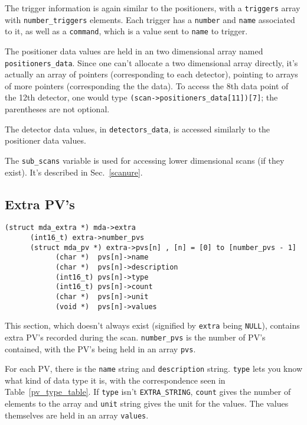 \documentclass[10pt,letterpaper]{article}
\begin{document}
The trigger information is again similar to the positioners, with a
\verb+triggers+ array with \verb+number_triggers+ elements.  Each
trigger has a \verb+number+ and \verb+name+ associated to it, as well
as a \verb+command+, which is a value sent to \verb+name+ to trigger.

The positioner data values are held in an two dimensional array named
\verb+positioners_data+.  Since one can't allocate a two dimensional
array directly, it's actually an array of pointers (corresponding to
each detector), pointing to arrays of more pointers (corresponding the
the data).  To access the 8th data point of the 12th detector, one
would type \verb+(scan->positioners_data[11])[7]+; the parentheses are
not optional.

The detector data values, in \verb+detectors_data+, is accessed
similarly to the positioner data values.

The \verb+sub_scans+ variable is used for accessing lower dimensional
scans (if they exist).  It's described in Sec.~\ref{scanure}.


\subsection{Extra PV's}

\begin{verbatim}
(struct mda_extra *) mda->extra
      (int16_t) extra->number_pvs
      (struct mda_pv *) extra->pvs[n] , [n] = [0] to [number_pvs - 1]
            (char *)  pvs[n]->name
            (char *)  pvs[n]->description
            (int16_t) pvs[n]->type    
            (int16_t) pvs[n]->count
            (char *)  pvs[n]->unit
            (void *)  pvs[n]->values
\end{verbatim}

This section, which doesn't always exist (signified by \verb+extra+
being \verb+NULL+), contains extra PV's recorded during the scan.
\verb+number_pvs+ is the number of PV's contained, with the PV's being
held in an array \verb+pvs+.

For each PV, there is the \verb+name+ string and \verb+description+
string.  \verb+type+ lets you know what kind of data type it is, with
the correspondence seen in Table~\ref{pv_type_table}.  If \verb+type+
isn't \verb+EXTRA_STRING+, \verb+count+ gives the number of elements to
the array and \verb+unit+ string gives the unit for the values.  The
values themselves are held in an array \verb+values+.
\end{document}
